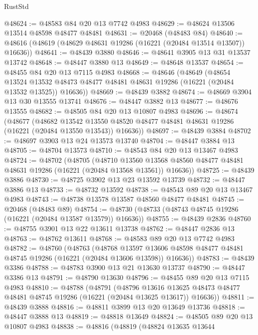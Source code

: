 \begin{lexlean}{RustStd}
\begin{coremodule}
@48624 := @48583 @84 @20 @13 @7742 @4983
@48629 := @48624 @13506 @13514 @48598 @48477 @48481
@48631 := @20468 (@48483 @84)
@48640 := @48616 (@48619 (@48629 @48631 @19286 (@16221 (@20484 @13514 @13507)) @16636))
@48641 := @48439 @3880
@48646 := @48641 @3905 @13 @31 @13537 @13742
@48648 := @48447 @3880 @13
@48649 := @48648 @13537
@48654 := @48455 @84 @20 @13 @7115 @4983
@48668 := @48646
    (@48649
      (@48654
        @13524
        @13532
        @48473
        @48477
        @48481
        @48631
        @19286
        (@16221 (@20484 @13532 @13525))
        @16636))
@48669 := @48439 @3882
@48674 := @48669 @3904 @13 @30 @13555 @13741
@48676 := @48447 @3882 @13
@48677 := @48676 @13555
@48682 := @48505 @84 @20 @13 @10807 @4983
@48696 := @48674
    (@48677
      (@48682
        @13542
        @13550
        @48520
        @48477
        @48481
        @48631
        @19286
        (@16221 (@20484 @13550 @13543))
        @16636))
@48697 := @48439 @3884
@48702 := @48697 @3903 @13 @24 @13573 @13740
@48704 := @48447 @3884 @13
@48705 := @48704 @13573
@48710 := @48543 @84 @20 @13 @13467 @4983
@48724 := @48702
    (@48705
      (@48710
        @13560
        @13568
        @48560
        @48477
        @48481
        @48631
        @19286
        (@16221 (@20484 @13568 @13561))
        @16636))
@48725 := @48439 @3886
@48730 := @48725 @3902 @13 @23 @13592 @13739
@48732 := @48447 @3886 @13
@48733 := @48732 @13592
@48738 := @48543 @89 @20 @13 @13467 @4983
@48743 := @48738 @13578 @13587 @48560 @48477 @48481
@48745 := @20468 (@48483 @89)
@48754 := @48730 (@48733 (@48743 @48745 @19286 (@16221 (@20484 @13587 @13579)) @16636))
@48755 := @48439 @2836
@48760 := @48755 @3901 @13 @22 @13611 @13738
@48762 := @48447 @2836 @13
@48763 := @48762 @13611
@48768 := @48583 @89 @20 @13 @7742 @4983
@48782 := @48760
    (@48763
      (@48768
        @13597
        @13606
        @48598
        @48477
        @48481
        @48745
        @19286
        (@16221 (@20484 @13606 @13598))
        @16636))
@48783 := @48439 @3386
@48788 := @48783 @3900 @13 @21 @13630 @13737
@48790 := @48447 @3386 @13
@48791 := @48790 @13630
@48796 := @48455 @89 @20 @13 @7115 @4983
@48810 := @48788
    (@48791
      (@48796
        @13616
        @13625
        @48473
        @48477
        @48481
        @48745
        @19286
        (@16221 (@20484 @13625 @13617))
        @16636))
@48811 := @48439 @3888
@48816 := @48811 @3899 @13 @20 @13649 @13736
@48818 := @48447 @3888 @13
@48819 := @48818 @13649
@48824 := @48505 @89 @20 @13 @10807 @4983
@48838 := @48816
    (@48819
      (@48824
        @13635
        @13644

\end{coremodule}
\end{lexlean}
